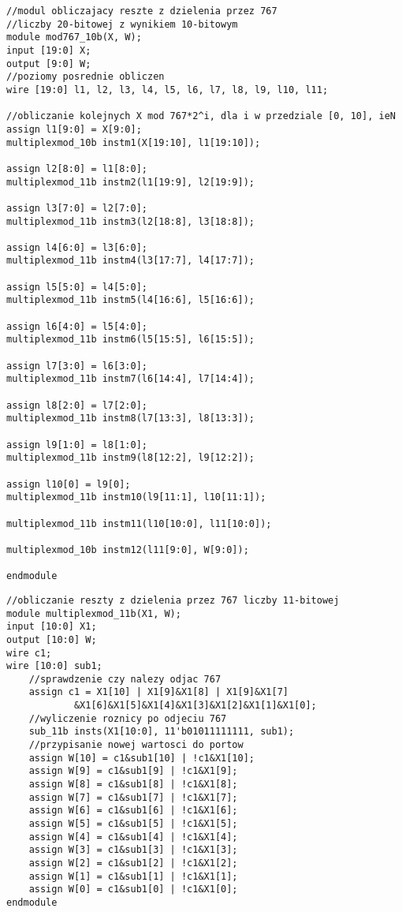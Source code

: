 \documentclass[a4paper]{article}
\begin{document}
\begin{lstlisting}[label=moduler]
//modul obliczajacy reszte z dzielenia przez 767 
//liczby 20-bitowej z wynikiem 10-bitowym
module mod767_10b(X, W);
input [19:0] X;
output [9:0] W;
//poziomy posrednie obliczen
wire [19:0] l1, l2, l3, l4, l5, l6, l7, l8, l9, l10, l11;

//obliczanie kolejnych X mod 767*2^i, dla i w przedziale [0, 10], ieN
assign l1[9:0] = X[9:0];
multiplexmod_10b instm1(X[19:10], l1[19:10]);

assign l2[8:0] = l1[8:0];
multiplexmod_11b instm2(l1[19:9], l2[19:9]);

assign l3[7:0] = l2[7:0];
multiplexmod_11b instm3(l2[18:8], l3[18:8]);

assign l4[6:0] = l3[6:0];
multiplexmod_11b instm4(l3[17:7], l4[17:7]);

assign l5[5:0] = l4[5:0];
multiplexmod_11b instm5(l4[16:6], l5[16:6]);

assign l6[4:0] = l5[4:0];
multiplexmod_11b instm6(l5[15:5], l6[15:5]);

assign l7[3:0] = l6[3:0];
multiplexmod_11b instm7(l6[14:4], l7[14:4]);

assign l8[2:0] = l7[2:0];
multiplexmod_11b instm8(l7[13:3], l8[13:3]);

assign l9[1:0] = l8[1:0];
multiplexmod_11b instm9(l8[12:2], l9[12:2]);

assign l10[0] = l9[0];
multiplexmod_11b instm10(l9[11:1], l10[11:1]);

multiplexmod_11b instm11(l10[10:0], l11[10:0]);

multiplexmod_10b instm12(l11[9:0], W[9:0]);

endmodule

\end{lstlisting}

\begin{lstlisting}[label=multliplex]
//obliczanie reszty z dzielenia przez 767 liczby 11-bitowej
module multiplexmod_11b(X1, W);
input [10:0] X1;
output [10:0] W;
wire c1;
wire [10:0] sub1;
	//sprawdzenie czy nalezy odjac 767
	assign c1 = X1[10] | X1[9]&X1[8] | X1[9]&X1[7]
		    &X1[6]&X1[5]&X1[4]&X1[3]&X1[2]&X1[1]&X1[0];
	//wyliczenie roznicy po odjeciu 767
	sub_11b insts(X1[10:0], 11'b01011111111, sub1);
	//przypisanie nowej wartosci do portow
	assign W[10] = c1&sub1[10] | !c1&X1[10];
	assign W[9] = c1&sub1[9] | !c1&X1[9];
	assign W[8] = c1&sub1[8] | !c1&X1[8];
	assign W[7] = c1&sub1[7] | !c1&X1[7];
	assign W[6] = c1&sub1[6] | !c1&X1[6];
	assign W[5] = c1&sub1[5] | !c1&X1[5];
	assign W[4] = c1&sub1[4] | !c1&X1[4];
	assign W[3] = c1&sub1[3] | !c1&X1[3];
	assign W[2] = c1&sub1[2] | !c1&X1[2];
	assign W[1] = c1&sub1[1] | !c1&X1[1];
	assign W[0] = c1&sub1[0] | !c1&X1[0];
endmodule
\end{lstlisting}
\end{document}
